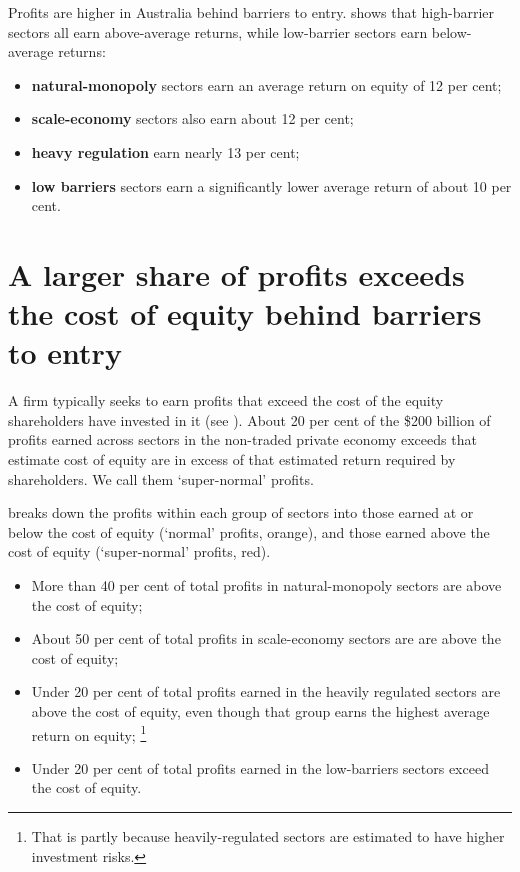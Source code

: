 Profits are higher in Australia behind barriers to entry. 
 shows that high-barrier sectors all earn above-average returns, while low-barrier sectors earn below-average returns: 
\begin{itemize}
    \item \textbf{natural-monopoly} sectors earn an average return on equity of 12 per cent;
    \item \textbf{scale-economy} sectors also earn about 12 per cent;
    \item \textbf{heavy regulation} earn nearly 13 per cent;
    \item \textbf{low barriers} sectors earn a significantly lower average return of about 10 per cent.
\end{itemize}

\newpage

\section{A larger share of profits exceeds the cost of equity behind barriers to entry}

A firm typically seeks to earn profits that exceed the cost of the equity shareholders have invested in it (see ). 
About 20 per cent of the \$200 billion of profits earned across sectors in the non-traded private economy exceeds that estimate cost of equity are in excess of that estimated return required by shareholders. We call them `super-normal' profits. 

 breaks down the profits within each group of sectors into those earned at or below the cost of equity (`normal' profits, orange), and those earned above the cost of equity (`super-normal' profits, red). 
\begin{itemize}
    \item More than 40 per cent of total profits in natural-monopoly sectors are above the cost of equity;
    \item About 50 per cent of total profits in scale-economy sectors are are above the cost of equity;
    \item Under 20 per cent of total profits earned in the heavily regulated sectors are above the cost of equity, even though that group earns the highest average return on equity;%
    \footnote{That is partly because heavily-regulated sectors are estimated to have higher investment risks.}
    \item Under 20 per cent of total profits earned in the low-barriers sectors exceed the cost of equity. 
\end{itemize}

